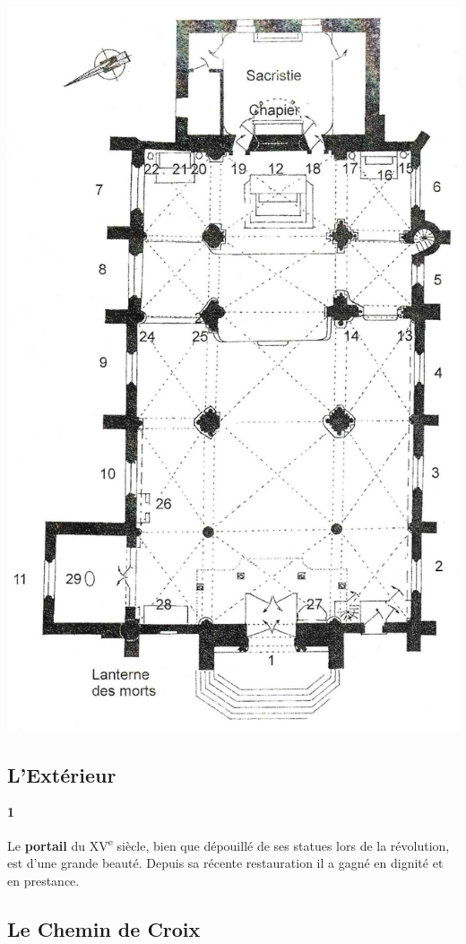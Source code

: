 \documentclass[a5paper, 9pt]{extarticle}
\newcommand{\linednote}[2]{
  \noindent
  \parbox[t]{0.9cm}{\small \textbf{#1}}%
  \parbox[t]{\dimexpr\linewidth-0.9cm}{\normalsize #2 \vspace{0.4em}}
  \newline
}
\begin{document}
\begin{center}
  \includegraphics[scale=0.7]{images/plan.jpg}
\end{center}

\subsection*{L'Extérieur}

\linednote{1}{Le \textbf{portail} du \textsc{XV}\textsuperscript{e} siècle, bien que
dépouillé de ses statues lors de la révolution, est d'une grande
beauté. Depuis sa récente restauration il a gagné en dignité et en
prestance.}

\subsection*{Le Chemin de Croix}
\end{document}
